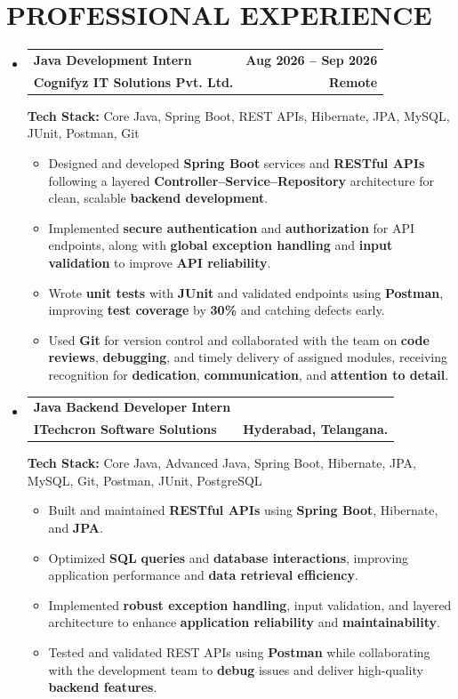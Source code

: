 \documentclass[letterpaper,11pt]{article}
\makeatletter
\newcommand{\resumeItem}[1]{\item\normalsize{{#1 \vspace{0pt}}}}
\newcommand{\resumeSubheading}[4]{
  \vspace{2pt}\item
    \begin{tabular*}{1.0\textwidth}[t]{l@{\extracolsep{\fill}}r}
      \textbf{\normalsize #1} & \textbf{\normalsize #2} \\
      \normalsize#3 & \normalsize #4 \\
    \end{tabular*}\vspace{0pt}
}
\newcommand{\resumeItemListStart}{\begin{itemize}[topsep=1pt,itemsep=1pt,parsep=0pt,leftmargin=0.2in]}
\newcommand{\resumeItemListEnd}{\end{itemize}\vspace{-4pt}}
\newcommand{\resumeSubHeadingListStart}{\begin{itemize}[leftmargin=0.0in, label={}, topsep=1pt, itemsep=1pt, parsep=0pt]}
\newcommand{\resumeSubHeadingListEnd}{\end{itemize}\vspace{-4pt}}
\makeatother
\begin{document}
\section{PROFESSIONAL EXPERIENCE}
\resumeSubHeadingListStart
  \resumeSubheading
    {\fontsize{14pt}{16pt}\selectfont Java Development Intern}{Aug 2026 -- Sep 2026}
    {\textbf{\fontsize{14pt}{16pt}\selectfont Cognifyz IT Solutions Pvt. Ltd.}}{\textbf{Remote}}
    \vspace{1pt}
    \textbf{\fontsize{13pt}{15pt}\selectfont Tech Stack:} Core Java, Spring Boot, REST APIs, Hibernate, JPA, MySQL, JUnit, Postman, Git \\
  {\renewcommand\labelitemii{$\bullet$}
  \resumeItemListStart
    \resumeItem{Designed and developed \textbf{Spring Boot} services and \textbf{RESTful APIs} following a layered \textbf{Controller--Service--Repository} architecture for clean, scalable \textbf{backend development}.}
    \resumeItem{Implemented \textbf{secure authentication} and \textbf{authorization} for API endpoints, along with \textbf{global exception handling} and \textbf{input validation} to improve \textbf{API reliability}.}
    \resumeItem{Wrote \textbf{unit tests} with \textbf{JUnit} and validated endpoints using \textbf{Postman}, improving \textbf{test coverage} by \textbf{30\%} and catching defects early.}
    \resumeItem{Used \textbf{Git} for version control and collaborated with the team on \textbf{code reviews}, \textbf{debugging}, and timely delivery of assigned modules, receiving recognition for \textbf{dedication}, \textbf{communication}, and \textbf{attention to detail}.}
  \resumeItemListEnd
  }

  \resumeSubheading
    {\fontsize{14pt}{16pt}\selectfont Java Backend Developer Intern}{}
    {\textbf{\fontsize{14pt}{16pt}\selectfont ITechcron Software Solutions}}{\textbf{Hyderabad, Telangana.}}
    \vspace{1pt}
    \textbf{\fontsize{13pt}{15pt}\selectfont Tech Stack:} Core Java, Advanced Java, Spring Boot, Hibernate, JPA, MySQL, Git, Postman, JUnit, PostgreSQL \\
  {\renewcommand\labelitemii{$\bullet$}
  \resumeItemListStart
    \resumeItem{Built and maintained \textbf{RESTful APIs} using \textbf{Spring Boot}, Hibernate, and \textbf{JPA}.}
    \resumeItem{Optimized \textbf{SQL} \textbf{queries} and \textbf{database interactions}, improving application performance and \textbf{data retrieval efficiency}.}
    \resumeItem{Implemented \textbf{robust exception handling}, input validation, and layered architecture to enhance \textbf{application reliability} and \textbf{maintainability}.}
    \resumeItem{Tested and validated REST APIs using \textbf{Postman} while collaborating with the development team to \textbf{debug} issues and deliver high-quality \textbf{backend features}.}
  \resumeItemListEnd
  }
\resumeSubHeadingListEnd
\end{document}
